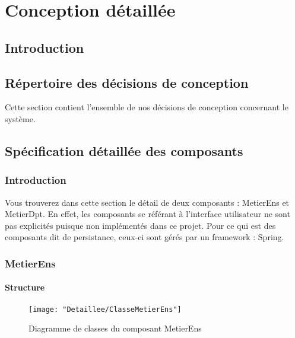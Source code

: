 
\chapter{Conception détaillée}

\section{Introduction}

\section{Répertoire des décisions de conception}

    Cette section contient l'ensemble de nos décisions de conception concernant le système.

\section{Spécification détaillée des composants}

    \subsection{Introduction}
    Vous trouverez dans cette section le détail de deux composants : MetierEns et MetierDpt. En effet, les composants se référant à l'interface utilisateur ne sont pas explicités puisque non implémentés dans ce projet. Pour ce qui est des composants dit de persistance, ceux-ci sont gérés par un framework : Spring.

    \newpage
    \subsection{MetierEns}
    
    \subsubsection{Structure}  
    
    \begin{figure}[!htbp]
    \begin{center}
    \texttt{[image: "Detaillee/ClasseMetierEns"]}
    \caption{Diagramme de classes du composant MetierEns}
    \label{classe-metierEns}
    \end{center}
    \end{figure}
    
